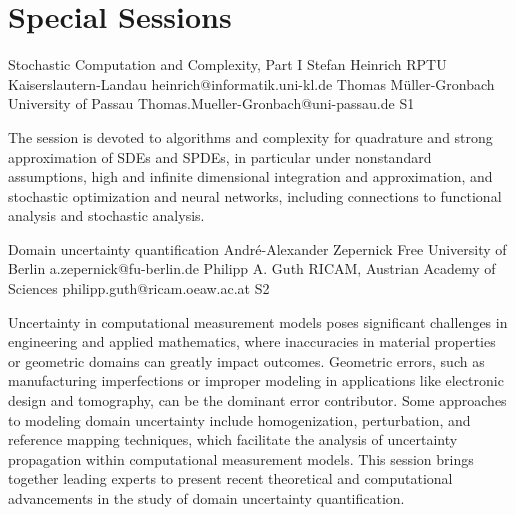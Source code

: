 \chapter{Special Sessions}

\begin{session}
 {Stochastic Computation and Complexity, Part I}%
 {Stefan Heinrich}%
 {RPTU Kaiserslautern-Landau}%
 {heinrich@informatik.uni-kl.de}%
 {Thomas M\"uller-Gronbach}%
 {University of Passau}%
 {Thomas.Mueller-Gronbach@uni-passau.de}%
 {S1}%
 {}%

 The session is devoted to algorithms and complexity for
 quadrature and strong approximation of SDEs and SPDEs, in particular under nonstandard assumptions,
 high and infinite dimensional integration and approximation, and
 stochastic optimization and neural networks,
 including connections to functional analysis and stochastic analysis.
 \medskip
\end{session}



\clearpage

\begin{session}
 {Domain uncertainty quantification}%
 {Andr\'e-Alexander Zepernick}%
 {Free University of Berlin}%
 {a.zepernick@fu-berlin.de}%
 {Philipp A. Guth}%
 {RICAM, Austrian Academy of Sciences}%
 {philipp.guth@ricam.oeaw.ac.at}%
 {S2}%
 {}%

 Uncertainty in computational measurement models poses significant challenges in engineering and applied mathematics, where inaccuracies in material properties or geometric domains can greatly impact outcomes. Geometric errors, such as manufacturing imperfections or improper modeling in applications like electronic design and tomography, can be the dominant error contributor. Some approaches to modeling domain uncertainty include homogenization, perturbation, and reference mapping techniques, which facilitate the analysis of uncertainty propagation within computational measurement models. This session brings together leading experts to present recent theoretical and computational advancements in the study of domain uncertainty quantification.
\end{session}

